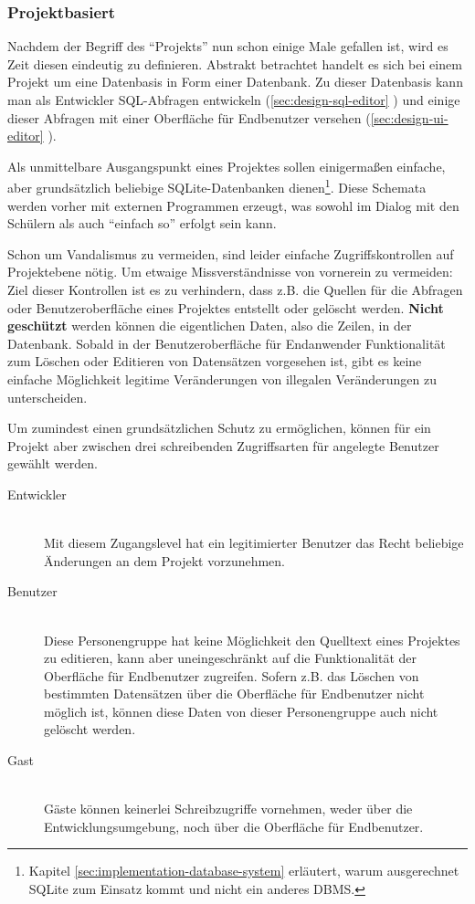 \subsubsection{Projektbasiert}

Nachdem der Begriff des ``Projekts'' nun schon einige Male gefallen ist, wird es Zeit diesen eindeutig zu definieren. Abstrakt betrachtet handelt es sich bei einem Projekt um eine Datenbasis in Form einer Datenbank. Zu dieser Datenbasis kann man als Entwickler SQL-Abfragen entwickeln (\ref{sec:design-sql-editor} ) und einige dieser Abfragen mit einer Oberfläche für Endbenutzer versehen (\ref{sec:design-ui-editor} ).

Als unmittelbare Ausgangspunkt eines Projektes sollen einigermaßen einfache, aber grundsätzlich beliebige SQLite-Datenbanken dienen\footnote{Kapitel \ref{sec:implementation-database-system}  erläutert, warum ausgerechnet SQLite zum Einsatz kommt und nicht ein anderes DBMS.}. Diese Schemata werden vorher mit externen Programmen erzeugt, was sowohl im Dialog mit den Schülern als auch ``einfach so'' erfolgt sein kann.

Schon um Vandalismus zu vermeiden, sind leider einfache Zugriffskontrollen auf Projektebene nötig. Um etwaige Missverständnisse von vornerein zu vermeiden: Ziel dieser Kontrollen ist es zu verhindern, dass z.B. die Quellen für die Abfragen oder Benutzeroberfläche eines Projektes entstellt oder gelöscht werden. \textbf{Nicht geschützt} werden können die eigentlichen Daten, also die Zeilen, in der Datenbank. Sobald in der Benutzeroberfläche für Endanwender Funktionalität zum Löschen oder Editieren von Datensätzen vorgesehen ist, gibt es keine einfache Möglichkeit legitime Veränderungen von illegalen Veränderungen zu unterscheiden.

Um zumindest einen grundsätzlichen Schutz zu ermöglichen, können für ein Projekt aber zwischen drei schreibenden Zugriffsarten für angelegte Benutzer gewählt werden.

\begin{description}
  \item[Entwickler] \hfill \\
    Mit diesem Zugangslevel hat ein legitimierter Benutzer das Recht beliebige Änderungen an dem Projekt vorzunehmen.
  \item[Benutzer] \hfill \\
    Diese Personengruppe hat keine Möglichkeit den Quelltext eines Projektes zu editieren, kann aber uneingeschränkt auf die Funktionalität der Oberfläche für Endbenutzer zugreifen. Sofern z.B. das Löschen von bestimmten Datensätzen über die Oberfläche für Endbenutzer nicht möglich ist, können diese Daten von dieser Personengruppe auch nicht gelöscht werden.
  \item[Gast] \hfill \\
    Gäste können keinerlei Schreibzugriffe vornehmen, weder über die Entwicklungsumgebung, noch über die Oberfläche für Endbenutzer.
\end{description}

